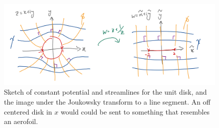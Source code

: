 \documentclass[letter-paper]{tufte-book}
\begin{document}
\begin{figure}
  \includegraphics{figs/comp_joukowsky}
  \caption{Sketch of constant potential and streamlines for the unit disk, and
  the image under the Joukowsky transform to a line segment. An off centered
  disk in $x$ would could be sent to something that resembles an aerofoil.}
\end{figure}








\mainmatter




%


\end{document}
